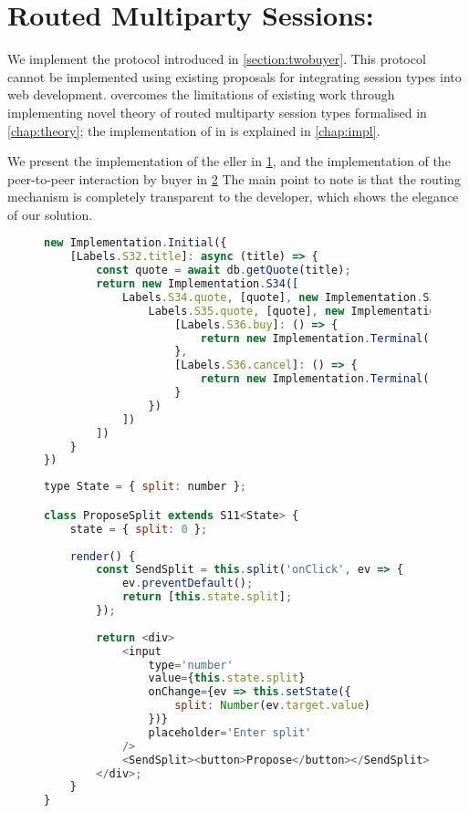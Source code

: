 \section{Routed Multiparty Sessions: }
\label{section:evaltwobuyer}

We implement the  protocol
introduced in \cref{section:twobuyer}. 
This protocol cannot be implemented using
existing proposals \cite{PureScript2019,MVU2020} for integrating
session types into web development.
\codegen overcomes the limitations of existing work
through implementing novel theory of routed multiparty
session types formalised in \cref{chap:theory};
the implementation of \newtheory in \codegen is 
explained in \cref{chap:impl}.

We present the implementation of the eller
in \cref{lst:evaltwobuyerseller}, 
and the implementation
of the peer-to-peer interaction by buyer 
in \cref{lst:evaltwobuyerA}
The main point to note is that the routing mechanism
is completely transparent to the developer,
which shows the elegance of our solution.

\begin{figure}[!h]
\begin{lstlisting}[language=javascript,tabsize=2]
new Implementation.Initial({
	[Labels.S32.title]: async (title) => {
		const quote = await db.getQuote(title);
		return new Implementation.S34([
			Labels.S34.quote, [quote], new Implementation.S35([
				Labels.S35.quote, [quote], new Implementation.S36({
					[Labels.S36.buy]: () => {
						return new Implementation.Terminal();
					},
					[Labels.S36.cancel]: () => {
						return new Implementation.Terminal();
					}
				})
			])
		])
	}
})
\end{lstlisting}
\label{lst:evaltwobuyerseller}
\end{figure}

\begin{figure}[!h]
\begin{lstlisting}[language=javascript]
type State = { split: number };

class ProposeSplit extends S11<State> {
	state = { split: 0 };
	
	render() {
		const SendSplit = this.split('onClick', ev => {
			ev.preventDefault();
			return [this.state.split];		
		});
		
		return <div>
			<input
				type='number'
				value={this.state.split}
				onChange={ev => this.setState({
					split: Number(ev.target.value)
				})}
				placeholder='Enter split'
			/>
			<SendSplit><button>Propose</button></SendSplit>	
		</div>;	
	}
}
\end{lstlisting}
\label{lst:evaltwobuyerA}
\end{figure}

